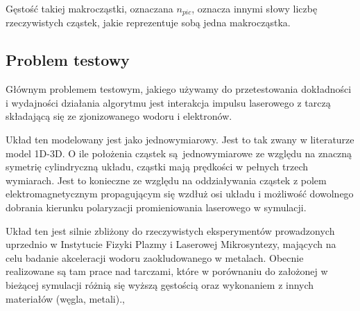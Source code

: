     Gęstość takiej makrocząstki, oznaczana $n_{pic}$, oznacza innymi słowy
    liczbę rzeczywistych cząstek, jakie reprezentuje sobą jedna makrocząstka.

    \subsection{Problem testowy}\label{seq:lasershield}

    Głównym problemem testowym, jakiego używamy do przetestowania dokładności i
    wydajności działania algorytmu jest interakcja impulsu laserowego z tarczą
    składającą się ze zjonizowanego wodoru i elektronów.

    Układ ten modelowany jest jako jednowymiarowy. Jest to tak zwany w
    literaturze model 1D-3D.  O ile położenia cząstek są jednowymiarowe ze
    względu na znaczną symetrię cylindryczną układu, cząstki mają prędkości w
    pełnych trzech wymiarach. Jest to konieczne ze względu na oddziaływania
    cząstek z polem elektromagnetycznym propagującym się wzdłuż osi układu
    i możliwość dowolnego dobrania kierunku polaryzacji promieniowania
    laserowego w symulacji.

    Układ ten jest silnie zbliżony do rzeczywistych eksperymentów prowadzonych uprzednio
    w Instytucie Fizyki Plazmy i Laserowej Mikrosyntezy, mających na celu
    badanie akceleracji wodoru zaokludowanego w metalach. Obecnie realizowane są
    tam prace nad tarczami, które w porównaniu do założonej w bieżącej symulacji różnią się
    wyższą gęstością oraz wykonaniem z innych materiałów (węgla, metali).\cite{JablonskiBunches},\cite{JablonskiPIC2D}

